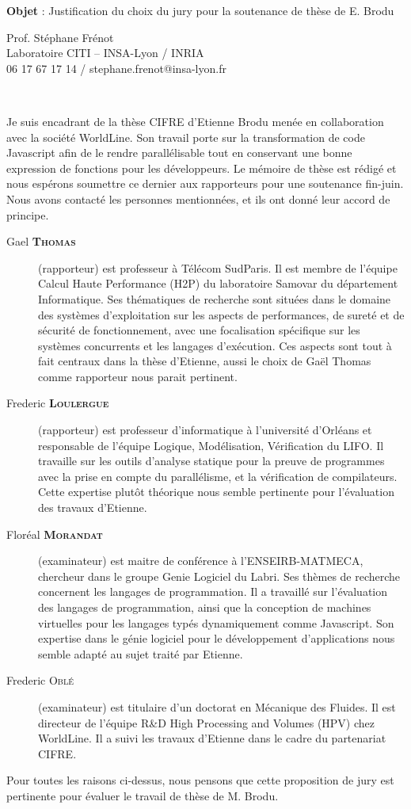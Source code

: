 \documentclass[11pt]{letter}
\begin{document}
\begin{letter}{\textbf{Objet} : Justification du choix du jury pour la soutenance de thèse de E. Brodu}

Prof. Stéphane Frénot\\
Laboratoire CITI – INSA-Lyon / INRIA\\
06 17 67 17 14 / stephane.frenot@insa-lyon.fr\\

\opening{~}
Je suis encadrant de la thèse CIFRE d'Etienne Brodu menée en collaboration
avec la société WorldLine. Son travail porte sur la transformation de code
Javascript afin de le rendre parallélisable tout en conservant une bonne
expression de fonctions pour les développeurs. 
Le mémoire de thèse est rédigé et nous espérons soumettre ce dernier aux
rapporteurs pour une soutenance fin-juin. Nous avons contacté les
personnes mentionnées, et ils ont donné leur accord de principe.

\begin{description}
  \item[Gael \bfseries{\scshape{Thomas}}] (rapporteur) est professeur à Télécom SudParis.
  Il est membre de l'équipe Calcul Haute Performance (H2P) du laboratoire
  Samovar du département Informatique.
  Ses thématiques de recherche sont situées dans le domaine des systèmes d'exploitation
  sur les aspects de performances, de sureté et de sécurité de
  fonctionnement, avec une focalisation spécifique sur les systèmes
  concurrents et les langages d'exécution.
  Ces aspects sont tout à fait centraux dans la thèse d'Etienne, aussi le choix de Gaël Thomas comme rapporteur nous parait pertinent.
  \item[Frederic \bfseries{\scshape{Loulergue}}] (rapporteur) est professeur d'informatique à l'université d'Orléans et responsable de l'équipe Logique, Modélisation, Vérification du LIFO. Il travaille sur les outils d'analyse statique pour la preuve de programmes avec la prise en compte du parallélisme, et la vérification de compilateurs. Cette expertise plutôt théorique nous semble pertinente pour l'évaluation des travaux d'Etienne.
  \item[Floréal \bfseries{\scshape{Morandat}}] (examinateur) est maitre de conférence à l'ENSEIRB-MATMECA, chercheur dans le groupe Genie Logiciel du Labri.
  Ses thèmes de recherche concernent les langages de programmation.
  Il a travaillé sur l'évaluation des langages de programmation, ainsi que
  la conception de machines virtuelles pour les langages typés
  dynamiquement comme Javascript. Son expertise dans le génie logiciel
  pour le développement d'applications nous semble adapté au sujet traité
  par Etienne. 
  \item[Frederic \scshape{Oblé}] (examinateur) est titulaire d'un doctorat en Mécanique des Fluides.
  Il est directeur de l'équipe R\&D High Processing and Volumes (HPV) chez WorldLine.
  Il a suivi les travaux d'Etienne dans le cadre du partenariat CIFRE.
\end{description}
Pour toutes les raisons ci-dessus, nous pensons que cette
proposition de jury est pertinente pour évaluer le travail de thèse de M.
Brodu.\\[2\baselineskip]


\end{letter}
\end{document}
